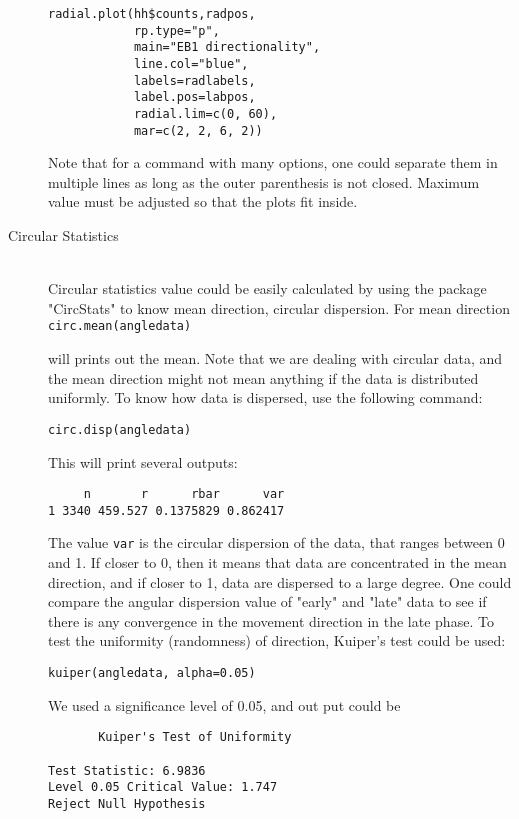 \documentclass[11pnt]{article}
\begin{document}
\begin{description}
\begin{verbatim}
radial.plot(hh$counts,radpos,
            rp.type="p",
            main="EB1 directionality",
            line.col="blue", 
            labels=radlabels, 
            label.pos=labpos, 
            radial.lim=c(0, 60),
            mar=c(2, 2, 6, 2))
\end{verbatim}
Note that for a command with many options, one could separate them in multiple lines as long as the outer parenthesis is not closed. Maximum value must be adjusted so that the plots fit inside. 

\item[Circular Statistics]\hfill\\

Circular statistics value could be easily calculated by using the package "CircStats" to know mean direction, circular dispersion. For mean direction\\
\verb"circ.mean(angledata)"

will prints out the mean. Note that we are dealing with circular data, and the mean direction might not mean anything if the data is distributed uniformly. To know how data is dispersed, use the following command:

\verb"circ.disp(angledata)"

This will print several outputs:

\begin{verbatim}
     n       r      rbar      var
1 3340 459.527 0.1375829 0.862417
\end{verbatim}

The value \verb"var" is the circular dispersion of the data, that ranges between 0 and 1. If closer to 0, then it means that data are concentrated in the mean direction, and if closer to 1, data are dispersed to a large degree. One could compare the angular dispersion value of "early" and "late" data to see if there is any convergence in the movement direction in the late phase. To test the uniformity (randomness) of direction, Kuiper's test could be used:

\verb"kuiper(angledata, alpha=0.05)"

We used a significance level of 0.05, and out put could be

\begin{verbatim}
       Kuiper's Test of Uniformity 
 
Test Statistic: 6.9836 
Level 0.05 Critical Value: 1.747 
Reject Null Hypothesis 
\end{verbatim}


\end{description}
\end{document}
